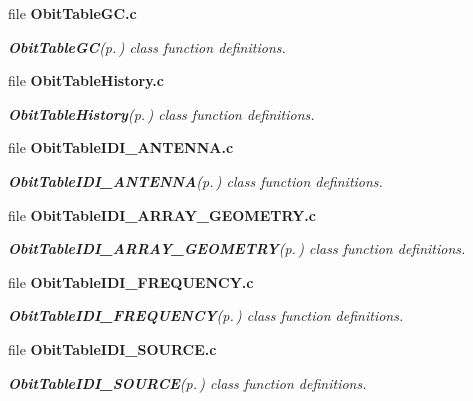 \begin{CompactItemize}
\item 
file {\bf Obit\-Table\-GC.c}
\begin{CompactList}\small\item\em {\bf Obit\-Table\-GC}{\rm (p.\,\pageref{structObitTableGC})} class function definitions. \item\end{CompactList}

\item 
file {\bf Obit\-Table\-History.c}
\begin{CompactList}\small\item\em {\bf Obit\-Table\-History}{\rm (p.\,\pageref{structObitTableHistory})} class function definitions. \item\end{CompactList}

\item 
file {\bf Obit\-Table\-IDI\_\-ANTENNA.c}
\begin{CompactList}\small\item\em {\bf Obit\-Table\-IDI\_\-ANTENNA}{\rm (p.\,\pageref{structObitTableIDI__ANTENNA})} class function definitions. \item\end{CompactList}

\item 
file {\bf Obit\-Table\-IDI\_\-ARRAY\_\-GEOMETRY.c}
\begin{CompactList}\small\item\em {\bf Obit\-Table\-IDI\_\-ARRAY\_\-GEOMETRY}{\rm (p.\,\pageref{structObitTableIDI__ARRAY__GEOMETRY})} class function definitions. \item\end{CompactList}

\item 
file {\bf Obit\-Table\-IDI\_\-FREQUENCY.c}
\begin{CompactList}\small\item\em {\bf Obit\-Table\-IDI\_\-FREQUENCY}{\rm (p.\,\pageref{structObitTableIDI__FREQUENCY})} class function definitions. \item\end{CompactList}

\item 
file {\bf Obit\-Table\-IDI\_\-SOURCE.c}
\begin{CompactList}\small\item\em {\bf Obit\-Table\-IDI\_\-SOURCE}{\rm (p.\,\pageref{structObitTableIDI__SOURCE})} class function definitions. \item\end{CompactList}


\end{CompactItemize}
